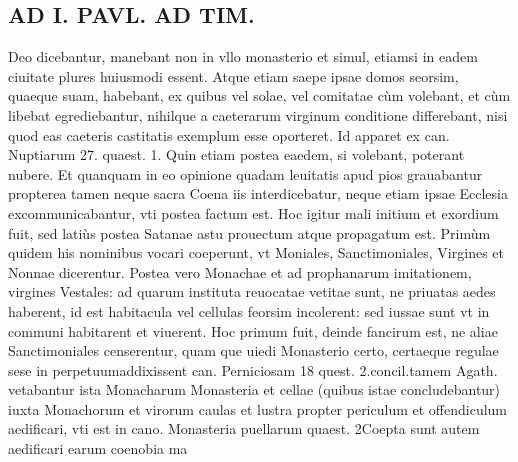 \documentclass{article}
\begin{document}
\begin{pages}
\section*{AD I. PAVL. AD TIM. }
\marginpar{[ p.292 ]}\pstart Deo dicebantur, manebant non in vllo monasterio et simul, etiamsi in eadem ciuitate plures huiusmodi essent. Atque etiam saepe ipsae domos seorsim, quaeque suam, habebant, ex quibus vel solae, vel comitatae cùm volebant, et cùm libebat egrediebantur, nihilque a caeterarum virginum conditione differebant, nisi quod eas caeteris castitatis exemplum esse oporteret. Id apparet ex can. Nuptiarum 27. quaest. 1. Quin etiam postea eaedem, si volebant, poterant nubere. Et quanquam in eo opinione quadam leuitatis apud pios grauabantur propterea tamen neque sacra Coena iis interdicebatur, neque etiam ipsae Ecclesia excommunicabantur, vti postea factum est. Hoc igitur mali initium et exordium fuit, sed latiùs postea Satanae astu prouectum atque propagatum est. Primùm quidem his nominibus vocari coeperunt, vt Moniales, Sanctimoniales, Virgines et Nonnae dicerentur. Postea vero Monachae et ad prophanarum imitationem, virgines Vestales: ad quarum instituta reuocatae vetitae sunt, ne priuatas aedes haberent, id est habitacula vel cellulas feorsim incolerent: sed iussae sunt vt in communi habitarent et viuerent. Hoc primum fuit, deinde fancirum est, ne aliae Sanctimoniales censerentur, quam que uiedi Monasterio certo, certaeque  regulae sese in perpetuumaddixissent can. Perniciosam 18 quest. 2.concil.tamem Agath. vetabantur ista Monacharum Monasteria et cellae (quibus istae concludebantur) iuxta Monachorum et virorum caulas et lustra propter periculum et offendiculum aedificari, vti est in cano. Monasteria puellarum quaest. 2Coepta sunt autem aedificari earum coenobia ma\pend

\end{pages}
\end{document}
